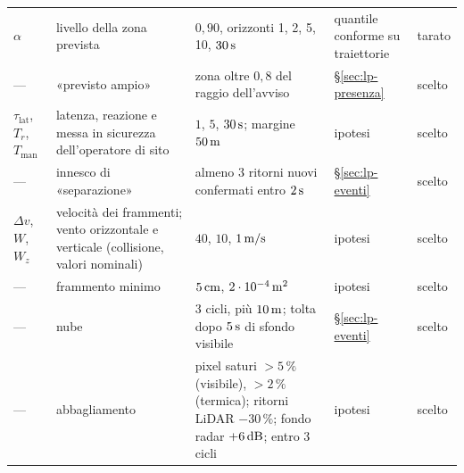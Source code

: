 \begin{table}[H]
\begin{tabularx}{\linewidth}{@{}p{1.25cm}Lp{3.5cm}Lp{1.2cm}@{}}
$\alpha$ & livello della zona prevista & $0{,}90$, orizzonti 1, 2, 5, 10, $30\,\mathrm{s}$ & quantile conforme su traiettorie & tarato\\
--- & «previsto ampio» & zona oltre $0{,}8$ del raggio dell'avviso & \S\ref{sec:lp-presenza} & scelto\\
$\tau_{\mathrm{lat}}$, $T_r$, $T_{\mathrm{man}}$ & latenza, reazione e messa in sicurezza dell'operatore di sito & $1$, $5$, $30\,\mathrm{s}$; margine $50\,\mathrm{m}$ & ipotesi & scelto\\
--- & innesco di «separazione» & almeno 3 ritorni nuovi confermati entro $2\,\mathrm{s}$ & \S\ref{sec:lp-eventi} & scelto\\
$\Delta v$, $W$, $W_z$ & velocità dei frammenti; vento orizzontale e verticale (collisione, valori nominali) & $40$, $10$, $1\,\mathrm{m/s}$ & ipotesi & scelto\\
--- & frammento minimo & $5\,\mathrm{cm}$, $2\cdot10^{-4}\,\mathrm{m^2}$ & ipotesi & scelto\\
--- & nube & 3 cicli, più $10\,\mathrm{m}$; tolta dopo $5\,\mathrm{s}$ di sfondo visibile & \S\ref{sec:lp-eventi} & scelto\\
--- & abbagliamento & pixel saturi $>5\,\%$ (visibile), $>2\,\%$ (termica); ritorni LiDAR $-30\,\%$; fondo radar $+6\,\mathrm{dB}$; entro 3 cicli & ipotesi & scelto\\
\bottomrule
\end{tabularx}
\end{table}

